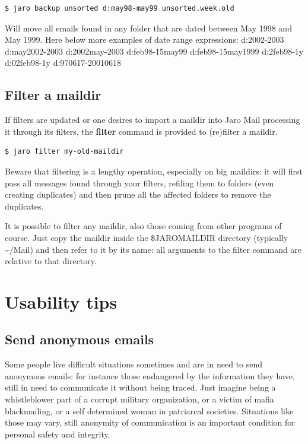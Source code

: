 \documentclass[a4,onecolumn,portrait]{article}
\begin{document}
\begin{verbatim}
$ jaro backup unsorted d:may98-may99 unsorted.week.old
\end{verbatim}

Will move all emails found in any folder that are dated between May
1998 and May 1999. Here below more examples of date range expressions:
d:2002-2003 d:may2002-2003 d:2002may-2003 d:feb98-15may99 d:feb98-15may1999 d:2feb98-1y d:02feb98-1y d:970617-20010618

\subsection{Filter a maildir}
\label{sec-9-4}

If filters are updated or one desires to import a maildir into Jaro
Mail processing it through its filters, the \textbf{filter} command is
provided to (re)filter a maildir.

\begin{verbatim}
$ jaro filter my-old-maildir
\end{verbatim}

Beware that filtering is a lengthy operation, especially on big
maildirs: it will first pass all messages found through your filters,
refiling them to folders (even creating duplicates) and then prune all
the affected folders to remove the duplicates.

It is possible to filter any maildir, also those coming from other
programs of course. Just copy the maildir inside the \$JAROMAILDIR
directory (typically \textasciitilde{}/Mail) and then refer to it by its name: all
arguments to the filter command are relative to that directory.
\section{Usability tips}
\label{sec-10}

\subsection{Send anonymous emails}
\label{sec-10-1}

Some people live difficult situations sometimes and are in need to
send anonymous emails: for instance those endangered by the
information they have, still in need to communicate it without
being traced. Just imagine being a whistleblower part of a corrupt
military organization, or a victim of mafia blackmailing, or a self
determined woman in patriarcal societies. Situations like those may
vary, still anonymity of communication is an important condition
for personal safety and integrity.
\end{document}
